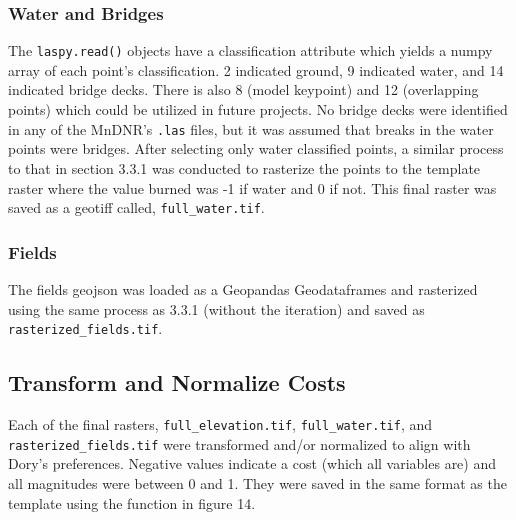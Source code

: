 \documentclass[article,12pt]{article}
\numberwithin{equation}{section}
\begin{document}
\subsubsection{Water and Bridges}

The \texttt{laspy.read()} objects have a classification attribute which yields a numpy array of each point's classification. 2 indicated ground, 9 indicated water, and 14 indicated bridge decks. There is also 8 (model keypoint) and 12 (overlapping points) which could be utilized in future projects. No bridge decks were identified in any of the MnDNR's \texttt{.las} files, but it was assumed that breaks in the water points were bridges. After selecting only water classified points, a similar process to that in section 3.3.1 was conducted to rasterize the points to the template raster where the value burned was -1 if water and 0 if not. This final raster was saved as a geotiff called, \texttt{full\_water.tif}.

\subsubsection{Fields}

The fields geojson was loaded as a Geopandas Geodataframes and rasterized using the same process as 3.3.1 (without the iteration) and saved as \texttt{rasterized\_fields.tif}.

\subsection{Transform and Normalize Costs}
\begin{adjustwidth}{0in}{-.8in}
	\begin{multicols}{2}
Each of the final rasters, \texttt{full\_elevation.tif}, \texttt{full\_water.tif}, and \texttt{rasterized\_fields.tif} were transformed and/or normalized to align with Dory's preferences. Negative values indicate a cost (which all variables are) and all magnitudes were between 0 and 1. They were saved in the same format as the template using the function in figure 14.\\ 

~\columnbreak
{}

	\end{multicols}
\end{adjustwidth}
\end{document}
